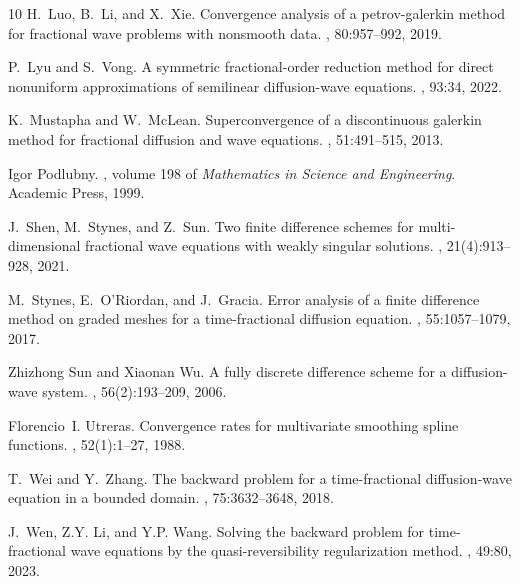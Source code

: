 \documentclass[11pt]{article}
\numberwithin{equation}{section}
\begin{document}
\begin{thebibliography}{10}
H.~Luo, B.~Li, and X.~Xie.
\newblock Convergence analysis of a petrov-galerkin method for fractional wave
  problems with nonsmooth data.
, 80:957--992, 2019.

P.~Lyu and S.~Vong.
\newblock A symmetric fractional-order reduction method for direct nonuniform
  approximations of semilinear diffusion-wave equations.
, 93:34, 2022.

K.~Mustapha and W.~McLean.
\newblock Superconvergence of a discontinuous galerkin method for fractional
  diffusion and wave equations.
, 51:491--515, 2013.

Igor Podlubny.
, volume 198 of {\em Mathematics in Science
  and Engineering}.
\newblock Academic Press, 1999.

J.~Shen, M.~Stynes, and Z.~Sun.
\newblock Two finite difference schemes for multi-dimensional fractional wave
  equations with weakly singular solutions.
, 21(4):913--928,
  2021.

M.~Stynes, E.~O’Riordan, and J.~Gracia.
\newblock Error analysis of a finite difference method on graded meshes for a
  time-fractional diffusion equation.
, 55:1057--1079, 2017.

Zhizhong Sun and Xiaonan Wu.
\newblock A fully discrete difference scheme for a diffusion-wave system.
, 56(2):193--209, 2006.

Florencio~I. Utreras.
\newblock Convergence rates for multivariate smoothing spline functions.
, 52(1):1--27, 1988.

T.~Wei and Y.~Zhang.
\newblock The backward problem for a time-fractional diffusion-wave equation in
  a bounded domain.
, 75:3632--3648,
  2018.

J.~Wen, Z.Y. Li, and Y.P. Wang.
\newblock Solving the backward problem for time-fractional wave equations by
  the quasi-reversibility regularization method.
, 49:80, 2023.


\end{thebibliography}
\end{document}
